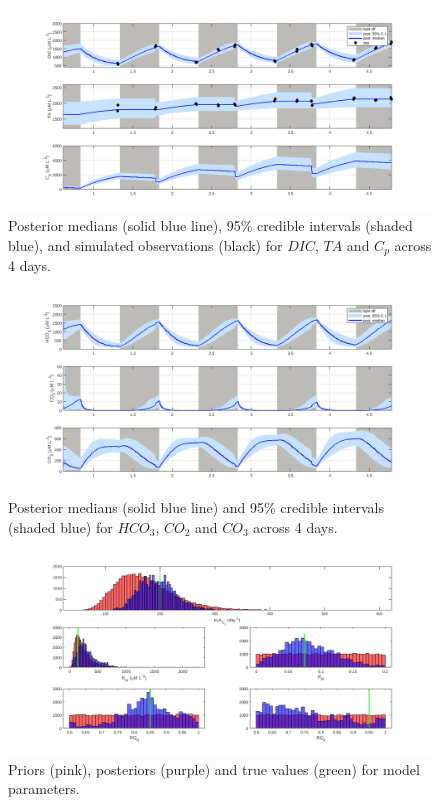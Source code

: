\documentclass{ruthesis}
\begin{document}
\begin{figure}
	\centerline{\includegraphics[width=1.2\textwidth]{images_microalgae/posterior_plots_with_fake_data_other/DIC_TA_Cp}}
	\caption[.]{Posterior medians (solid blue line), 95\% credible intervals (shaded blue), and simulated observations (black) for $DIC$, $TA$ and $C_p$ across 4 days.}
	\label{fig:pos_sim_DIC_TA_Cp_other}
\end{figure}

\begin{figure}
	\centerline{\includegraphics[width=1.2\textwidth]{images_microalgae/posterior_plots_with_fake_data_other/carbon}}
	\caption[.]{Posterior medians (solid blue line) and 95\% credible intervals (shaded blue) for $HCO_3$, $CO_2$ and $CO_3$ across 4 days.}
	\label{fig:pos_sim_carbon_other}
\end{figure}


\begin{figure}
	\centerline{\includegraphics[width=1.3\textwidth]{images_microalgae/posterior_plots_with_fake_data_other/model_parameters}}
	\caption[.]{Priors (pink), posteriors (purple) and true values (green) for model parameters.}
	\label{fig:pos_sim_model_parameters_other}
\end{figure}
\end{document}
